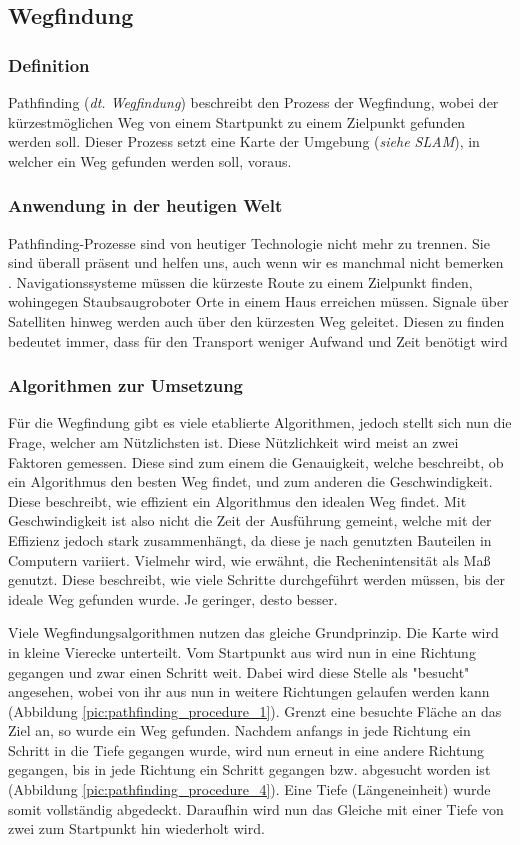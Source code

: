 {{	\subsection{Wegfindung}
	{
		\subsubsection{Definition}
		{
			Pathfinding (\emph{dt. Wegfindung}) beschreibt den Prozess der Wegfindung, wobei der kürzestmöglichen Weg von einem Startpunkt zu einem Zielpunkt gefunden werden soll. Dieser Prozess setzt eine Karte der Umgebung (\emph{siehe SLAM}), in welcher ein Weg gefunden werden soll, voraus.
		}
		
		\subsubsection{Anwendung in der heutigen Welt}
		{
			Pathfinding-Prozesse sind von heutiger Technologie nicht mehr zu trennen. Sie sind überall präsent und helfen uns, auch wenn wir es manchmal nicht bemerken . Navigationssysteme müssen die kürzeste Route zu einem Zielpunkt finden, wohingegen Staubsaugroboter Orte in einem Haus erreichen müssen. Signale über Satelliten hinweg werden auch über den kürzesten Weg geleitet. Diesen zu finden bedeutet immer, dass für den Transport weniger Aufwand und Zeit benötigt wird
		}
		
		\subsubsection{Algorithmen zur Umsetzung}
		{
			Für die Wegfindung gibt es viele etablierte Algorithmen, jedoch stellt sich nun die Frage, welcher am Nützlichsten ist. Diese Nützlichkeit wird meist an zwei Faktoren gemessen. Diese sind zum einem die Genauigkeit, welche beschreibt, ob ein Algorithmus den besten Weg findet, und zum anderen die Geschwindigkeit. Diese beschreibt, wie effizient ein Algorithmus den idealen Weg findet. Mit Geschwindigkeit ist also nicht die Zeit der Ausführung gemeint, welche mit der Effizienz jedoch stark zusammenhängt, da diese je nach genutzten Bauteilen in Computern variiert. Vielmehr wird, wie erwähnt, die Rechenintensität als Maß genutzt. Diese beschreibt, wie viele Schritte durchgeführt werden müssen, bis der ideale Weg gefunden wurde. Je geringer, desto besser. 
			
			Viele Wegfindungsalgorithmen nutzen das gleiche Grundprinzip. Die Karte wird in kleine Vierecke unterteilt. Vom Startpunkt aus wird nun in eine Richtung gegangen und zwar einen Schritt weit. Dabei wird diese Stelle als "besucht" angesehen, wobei von ihr aus nun in weitere Richtungen gelaufen werden kann (Abbildung \ref{pic:pathfinding_procedure_1}). Grenzt eine besuchte Fläche an das Ziel an, so wurde ein Weg gefunden. Nachdem anfangs in jede Richtung ein Schritt in die Tiefe gegangen wurde, wird nun erneut in eine andere Richtung gegangen, bis in jede Richtung ein Schritt gegangen bzw. abgesucht worden ist (Abbildung \ref{pic:pathfinding_procedure_4}). Eine Tiefe (Längeneinheit) wurde somit vollständig abgedeckt. Daraufhin wird nun das Gleiche mit einer Tiefe von zwei zum Startpunkt hin wiederholt wird.
			
}}}}
